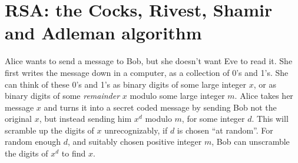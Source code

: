 \section{RSA: the Cocks, Rivest, Shamir and Adleman algorithm}
\begin{example}
Alice wants to send a message to Bob, but she doesn't want Eve to read it.
She first writes the message down in a computer, as a collection of 0's and 1's.
She can think of these 0's and 1's as binary digits of some large integer \(x\), or as binary digits of some \emph{remainder} \(x\) modulo some large integer \(m\).
Alice takes her message \(x\) and turns it into a secret coded message by sending Bob not the original \(x\), but instead sending him \(x^d\) modulo \(m\), for some integer \(d\).
This will scramble up the digits of \(x\) unrecognizably, if \(d\) is chosen ``at random''.
For random enough \(d\), and suitably chosen positive integer \(m\), Bob can unscramble the digits of \(x^d\) to find \(x\).
\end{example}
